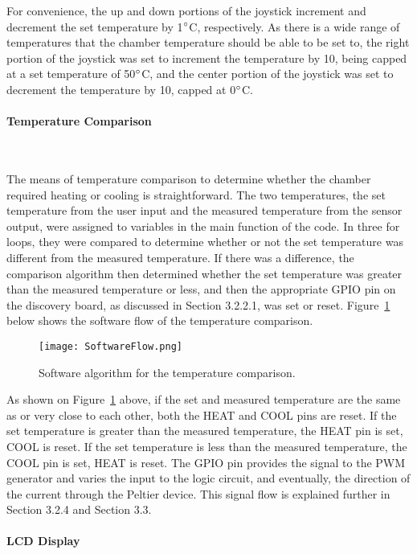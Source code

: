\documentclass[11pt,letter]{article}
\begin{document}
For convenience, the up and down portions of the joystick increment and decrement the set temperature by 1$\degree$C, respectively. As there is a wide range of temperatures that the chamber temperature should be able to be set to, the right portion of the joystick was set to increment the temperature by 10, being capped at a set temperature of 50$\degree$C, and the center portion of the joystick was set to decrement the temperature by 10, capped at 0$\degree$C.

\paragraph{Temperature Comparison} \

The means of temperature comparison to determine whether the chamber required heating or cooling is straightforward. The two temperatures, the set temperature from the user input and the measured temperature from the sensor output, were assigned to variables in the main function of the code. In three for loops, they were compared to determine whether or not the set temperature was different from the measured temperature. If there was a difference, the comparison algorithm then determined whether the set temperature was greater than the measured temperature or less, and then the appropriate GPIO pin on the discovery board, as discussed in Section 3.2.2.1, was set or reset. Figure~\ref{fig:software} below shows the software flow of the temperature comparison. 

\begin{figure}[H]
    \centering
    \texttt{[image: SoftwareFlow.png]}
    \caption{Software algorithm for the temperature comparison.}
    \label{fig:software}
\end{figure}

As shown on Figure~\ref{fig:software} above, if the set and measured temperature are the same as or very close to each other, both the HEAT and COOL pins are reset. If the set temperature is greater than the measured temperature, the HEAT pin is set, COOL is reset. If the set temperature is less than the measured temperature, the COOL pin is set, HEAT is reset. The GPIO pin provides the signal to the PWM generator and varies the input to the logic circuit, and eventually, the direction of the current through the Peltier device. This signal flow is explained further in Section 3.2.4 and Section 3.3.

\paragraph{LCD Display} \
\end{document}
